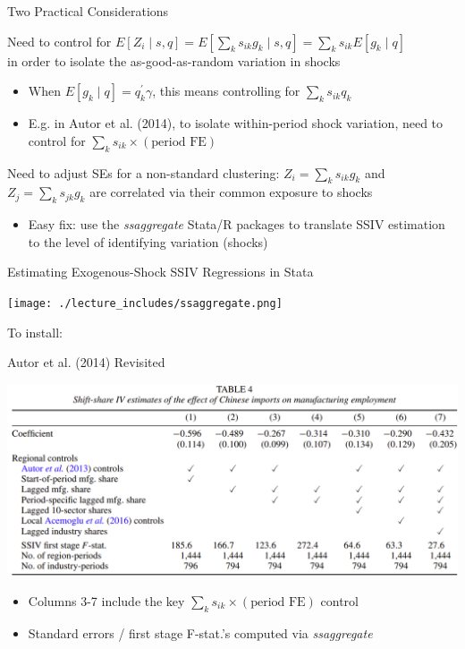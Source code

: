\documentclass{beamer}
\begin{document}
\begin{frame}{Two Practical Considerations}

Need to control for $E[Z_i\mid s,q]=E[\sum_k s_{ik}g_{k}\mid s,q]=\sum_k s_{ik}E[g_k\mid q]$ \\ in order to isolate the as-good-as-random variation in shocks
\begin{itemize}
\item When $E[g_k\mid q]=q_k^\prime\gamma$, this means controlling for $\sum_k s_{ik}q_k$ 
\item E.g. in Autor et al. (2014), to isolate within-period shock variation, need to control for $\sum_k s_{ik}\times (\text{period FE})$
\end{itemize}\bigskip\pause{}

Need to adjust SEs for a non-standard clustering: $Z_i=\sum_k s_{ik}g_k$ and $Z_j=\sum_k s_{jk} g_k$ are correlated via their common exposure to shocks
\begin{itemize}
\item Easy fix: use the \emph{ssaggregate} Stata/R packages to translate SSIV estimation to the level of identifying variation (shocks)
\end{itemize}
\end{frame}

\begin{frame}{Estimating Exogenous-Shock SSIV Regressions in Stata}
\vspace{-0.3cm}
\begin{center}
\texttt{[image: ./lecture\_includes/ssaggregate.png]}
\end{center}
To install: 
\end{frame}

\begin{frame}{Autor et al. (2014) Revisited}
\begin{center}
\includegraphics[scale=0.52]{./lecture_includes/adh_bhj_restud.png}
\end{center}
\begin{itemize}
\item Columns 3-7 include the key  $\sum_k s_{ik}\times (\text{period FE})$ control
\item Standard errors / first stage F-stat.'s computed via \emph{ssaggregate}
\end{itemize}
\end{frame}
\end{document}

